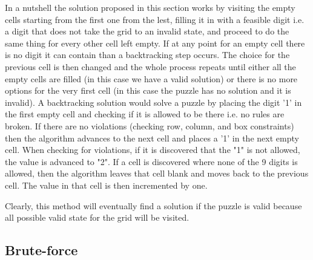 In a nutshell the solution proposed in this section works by visiting the empty
cells starting from the first one from the lest, filling it in with a feasible
digit i.e. a digit that does not take the grid to an invalid state, and proceed
to do the same thing for every other cell left empty. If at any point for an
empty cell there is no digit it can contain than a backtracking step occurs. The
choice for the previous cell is then changed and the whole process repeats until
either all the empty cells are filled (in this case we have a valid solution) or
there is no more options for the very first cell (in this case the puzzle has no
solution and it is invalid).
A backtracking solution would solve a puzzle by placing the digit '1' in the
first empty cell and checking if it is allowed to be there i.e. no rules are broken. If
there are no violations (checking row, column, and box constraints) then the algorithm advances to
the next cell and places a '1' in the next empty cell. When checking for violations, if it is discovered that
the "1" is not allowed, the value is advanced to "2". If a cell is discovered where none of the 9
digits is allowed, then the algorithm leaves that cell blank and moves back to the previous cell.
The value in that cell is then incremented by one.

Clearly, this method will eventually find a solution if the puzzle is valid
because all possible valid state for the grid will be visited. 

\subsection{Brute-force}
\label{sudoku:sec:bruteforce}



